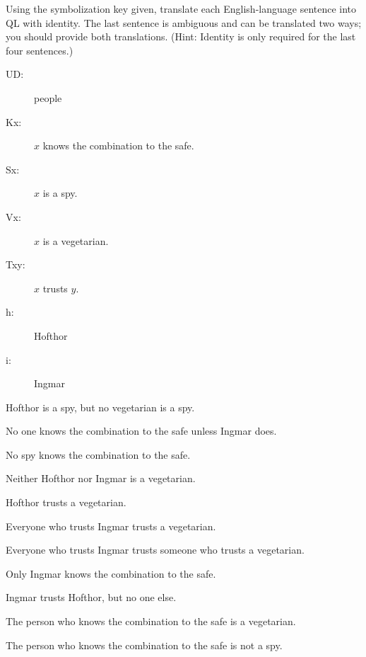 \problempart
Using the symbolization key given, translate each English-language sentence into QL with identity. The last sentence is ambiguous and can be translated two ways; you should provide both translations. (Hint: Identity is only required for the last four sentences.)
\begin{description}
\item[UD:] people
\item[Kx:] $x$ knows the combination to the safe.
\item[Sx:] $x$ is a spy.
\item[Vx:] $x$ is a vegetarian.
\item[Txy:] $x$ trusts $y$.
\item[h:] Hofthor
\item[i:] Ingmar
\end{description}
\begin{kormanize}
\item Hofthor is a spy, but no vegetarian is a spy.
\item No one knows the combination to the safe unless Ingmar does.
\item No spy knows the combination to the safe.
\item Neither Hofthor nor Ingmar is a vegetarian.
\item Hofthor trusts a vegetarian.
\item Everyone who trusts Ingmar trusts a vegetarian.
\item Everyone who trusts Ingmar trusts someone who trusts a vegetarian.
\item Only Ingmar knows the combination to the safe.
\item Ingmar trusts Hofthor, but no one else.
\item The person who knows the combination to the safe is a vegetarian.
\item The person who knows the combination to the safe is not a spy.
\end{kormanize}



